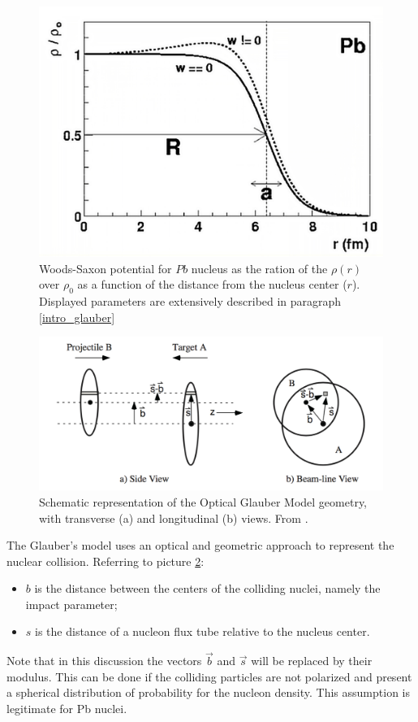\begin{figure}[!t]
\begin{center}
\includegraphics[width=0.7\linewidth]{Chapters/Analysis/Figs/woods-saxon.pdf}
\caption{Woods-Saxon potential for $Pb$ nucleus as the ration of the $\rho(r)$ over $\rho_0$ as a function of the distance from the nucleus center ($r$).
Displayed parameters are extensively described in paragraph \ref{intro_glauber}}
\label{fig:WoodsSaxon}
\end{center}
\end{figure}

\begin{figure}[!t]
\begin{center}
\includegraphics[width=0.85\linewidth]{Chapters/Analysis/Figs/glauber-side.pdf}
\caption{Schematic representation of the Optical Glauber Model geometry, with transverse (a) and longitudinal (b) views. From \cite{Miller:2007ri}.}
\label{fig:GlauberSide}
\end{center}
\end{figure}

The Glauber's model uses an optical and geometric approach to represent the nuclear collision.
Referring to picture \ref{fig:GlauberSide}:
\begin{itemize}
\item $b$ is the distance between the centers of the colliding nuclei, namely the impact parameter;
\item $s$ is the distance of a nucleon flux tube relative to the nucleus center.
\end{itemize}
Note that in this discussion the vectors $\vec{b}$ and $\vec{s}$ will be replaced by their modulus.
This can be done if the colliding particles are not polarized and present a spherical distribution of probability for the nucleon density.
This assumption is legitimate for Pb nuclei.


